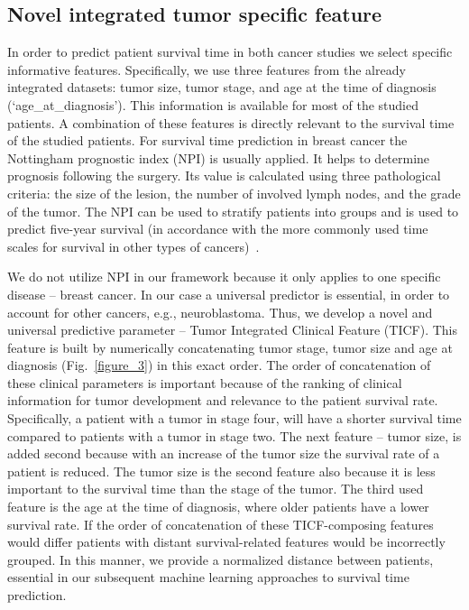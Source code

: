 \documentclass{bmcart}
\begin{document}
\subsection{Novel integrated tumor specific feature}

In order to predict patient survival time in both cancer studies we
select specific informative features. Specifically, we use three
features from the already integrated datasets: tumor size, tumor stage,
and age at the time of diagnosis
({\textquoteleft}age\_at\_diagnosis{\textquoteright}). This information
is available for most of the studied patients. A combination of these
features is directly relevant to the survival time of the studied
patients. For survival time prediction in breast cancer the Nottingham
prognostic index (NPI) is usually applied. It helps to determine
prognosis following the surgery. Its value is calculated using three
pathological criteria: the size of the lesion, the number of involved
lymph nodes, and the grade of the tumor. The NPI can be used to
stratify patients into groups and is used to predict five-year survival
(in accordance with the more commonly used time scales for survival in
other types of cancers)~\cite{15}.

We do not utilize NPI in our framework because it only applies to one
specific disease -- breast cancer. In our case a universal predictor is
essential, in order to account for other cancers, e.g., neuroblastoma.
Thus, we develop a novel and universal predictive parameter -- Tumor
Integrated Clinical Feature (TICF). This feature is built by
numerically concatenating tumor stage, tumor size and age at diagnosis
(Fig.~\ref{figure_3}) in this exact order. The order of concatenation of these
clinical parameters is important because of the ranking of clinical
information for tumor development and relevance to the patient survival
rate. Specifically, a patient with a tumor in stage four, will have a
shorter survival time compared to patients with a tumor in stage two.
The next feature -- tumor size, is added second because with an
increase of the tumor size the survival rate of a patient is reduced.
The tumor size is the second feature also because it is less important
to the survival time than the stage of the tumor. The third used
feature is the age at the time of diagnosis, where older patients have
a lower survival rate. If the order of concatenation of these
TICF-composing features would differ patients with distant
survival-related features would be incorrectly grouped. In this manner,
we provide a normalized distance between patients, essential in our
subsequent machine learning approaches to survival time prediction.
\end{document}
